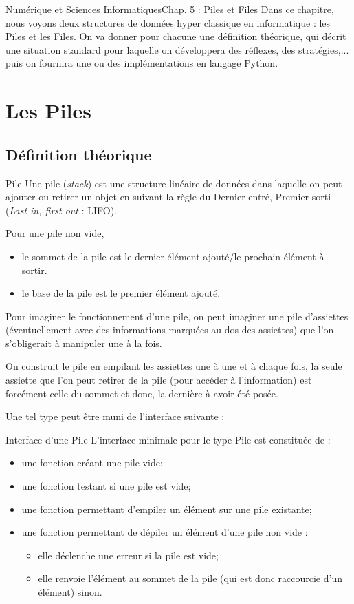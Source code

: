 \documentclass[11pt,a4paper,french,twoside]{PMCours}
\begin{document}
{Numérique et Sciences Informatiques}{Chap. 5 : Piles et Files}
Dans ce chapitre, nous voyons deux structures de données hyper classique en informatique : 
les Piles et les Files. On va donner pour chacune une définition théorique, qui décrit une situation standard pour laquelle on développera des réflexes, des stratégies,... puis on fournira une ou des implémentations en langage Python.   
\section{Les Piles}
\subsection{Définition théorique}
\begin{Definition}{Pile}
Une {\color{red}pile} ({\em stack}) est une structure linéaire de données dans laquelle on 
peut ajouter ou retirer un objet en suivant la règle du {\color{red} Dernier entré, 
Premier sorti} ({\em Last in, first out} : LIFO).

Pour une pile non vide, 
\begin{itemize}
    \item le {\color{red} sommet de la pile} est le dernier élément ajouté/le 
prochain élément à sortir.
   \item le {\color{red} base de la pile} est le premier élément ajouté.
\end{itemize}
\end{Definition}

\medskip
Pour imaginer le fonctionnement d'une pile, on peut imaginer une pile d'assiettes (éventuellement avec des informations marquées au dos des assiettes) que l'on s'obligerait à manipuler une à la fois.

On construit le pile en empilant les assiettes une à une et à chaque fois, la seule assiette que l'on peut retirer de la pile (pour accéder à l'information) est forcément celle du sommet et donc, la dernière à avoir été posée.

\vfill\noindent 
Une tel type peut être muni de l'interface suivante : 

\medskip
\begin{Definition}{Interface d'une Pile}
L'interface minimale pour le type Pile est constituée de :
\begin{itemize}
\item une fonction créant une pile vide; 
\item une fonction testant si une pile est vide;
\item une fonction permettant d'empiler un élément sur une pile existante;
\item une fonction permettant de dépiler un élément d'une pile non vide : 
\begin{itemize}
\item elle déclenche une erreur si la pile est vide;
\item elle renvoie l'élément au sommet de la pile (qui est donc raccourcie d'un élément) sinon.
\end{itemize}
\end{itemize}
\end{Definition}
\newpage\noindent
\end{document}
